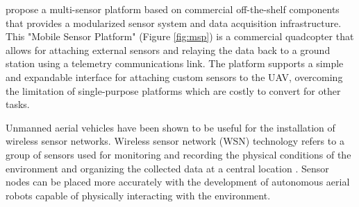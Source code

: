 
\cite{sørensen_jacobsen_hansen_2017} \hspace*{0.3cm} \textit{}
\hspace*{0.5cm}
propose a multi-sensor platform based on commercial off-the-shelf components that provides a modularized sensor system and data acquisition infrastructure. This "Mobile Sensor Platform" (Figure \ref{fig:msp}) is a commercial quadcopter that allows for attaching external sensors and relaying the data back to a ground station using a telemetry communications link. The platform supports a simple and expandable interface for attaching custom sensors to the UAV, overcoming the limitation of single-purpose platforms which are costly to convert for other tasks.  


Unmanned aerial vehicles have been shown to be useful for the installation of wireless sensor networks. Wireless sensor network (WSN) technology refers to a group of sensors used for monitoring and recording the physical conditions of the environment and organizing the collected data at a central location \cite{metrology_survey}. Sensor nodes can be placed more accurately  with the development of autonomous aerial robots capable of physically interacting with the environment.


